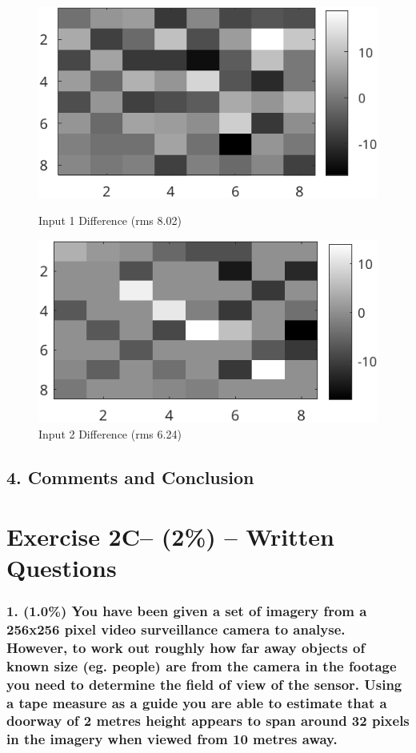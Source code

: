 \documentclass{article}
\begin{document}
	
	\begin{figure}[ht]
  	\centering
  	\begin{minipage}[t]{0.45\textwidth}
    	\centering
    	\includegraphics[width=\textwidth]{2B_Diff1}
    	\caption{Input 1 Difference (rms 8.02)}
    	\label{fig:2B_Diff1}
  	\end{minipage}\hfill
  	\begin{minipage}[t]{0.45\textwidth}
    	\centering
    	\includegraphics[width=\textwidth]{2B_Diff2}
    	\caption{Input 2 Difference (rms 6.24)}
    	\label{fig:2B_Diff2}
  	\end{minipage}
	\end{figure}

	\subsection*{4. Comments and Conclusion}



	\newpage
	\section*{Exercise 2C– (2\%) – Written Questions }
	
	\subsubsection*{1. (1.0\%) You have been given a set of imagery from a 256x256 pixel video surveillance camera to analyse. However, to work out roughly how far away objects of known size (eg. people) are from the camera in the footage you need to determine the field of view of the sensor. Using a tape measure as a guide you are able to estimate that a doorway of 2 metres height appears to span around 32 pixels in the imagery when viewed from 10 metres away.}
	
\end{document}
